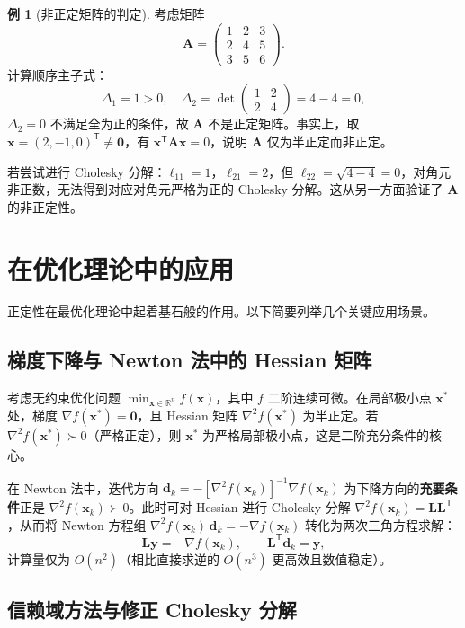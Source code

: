 \documentclass[12pt,a4paper]{article}
\theoremstyle{mystyle}
\theoremstyle{proofstyle}
\theoremstyle{definition}
\newtheorem{example}[theorem]{例}
\theoremstyle{remark}
\newcommand{\R}{\mathbb{R}}
\newcommand{\T}{^{\mathsf{T}}}
\newcommand{\x}{\mathbf{x}}
\newcommand{\y}{\mathbf{y}}
\newcommand{\A}{\mathbf{A}}
\newcommand{\Lmat}{\mathbf{L}}
\newcommand{\zero}{\mathbf{0}}
\begin{document}
\begin{example}[非正定矩阵的判定]
考虑矩阵
\[
    \A = \begin{pmatrix}
        1 & 2 & 3 \\
        2 & 4 & 5 \\
        3 & 5 & 6
    \end{pmatrix}.
\]
计算顺序主子式：
\[
    \Delta_1 = 1 > 0,\quad
    \Delta_2 = \det\begin{pmatrix} 1 & 2 \\ 2 & 4 \end{pmatrix} = 4 - 4 = 0,
\]
$\Delta_2 = 0$ 不满足全为正的条件，故 $\A$ 不是正定矩阵。事实上，取 $\x = (2,-1,0)\T \neq \zero$，有 $\x\T\A\x = 0$，说明 $\A$ 仅为半正定而非正定。

若尝试进行 Cholesky 分解：$\ell_{11}=1$，$\ell_{21}=2$，但 $\ell_{22} = \sqrt{4-4}=0$，对角元非正数，无法得到对应对角元严格为正的 Cholesky 分解。这从另一方面验证了 $\A$ 的非正定性。
\end{example}

\section{在优化理论中的应用}

正定性在最优化理论中起着基石般的作用。以下简要列举几个关键应用场景。

\subsection{梯度下降与 Newton 法中的 Hessian 矩阵}

考虑无约束优化问题 $\min_{\x \in \R^n} f(\x)$，其中 $f$ 二阶连续可微。在局部极小点 $\x^*$ 处，梯度 $\nabla f(\x^*) = \zero$，且 Hessian 矩阵 $\nabla^2 f(\x^*)$ 为半正定。若 $\nabla^2 f(\x^*) \succ 0$（严格正定），则 $\x^*$ 为严格局部极小点，这是二阶充分条件的核心。

在 Newton 法中，迭代方向 $\mathbf{d}_k = -[\nabla^2 f(\x_k)]^{-1}\nabla f(\x_k)$ 为下降方向的\textbf{充要条件}正是 $\nabla^2 f(\x_k) \succ 0$。此时可对 Hessian 进行 Cholesky 分解 $\nabla^2 f(\x_k) = \Lmat\Lmat\T$，从而将 Newton 方程组 $\nabla^2 f(\x_k)\,\mathbf{d}_k = -\nabla f(\x_k)$ 转化为两次三角方程求解：
\[
    \Lmat\y = -\nabla f(\x_k), \qquad \Lmat\T\mathbf{d}_k = \y,
\]
计算量仅为 $O(n^2)$（相比直接求逆的 $O(n^3)$ 更高效且数值稳定）。

\subsection{信赖域方法与修正 Cholesky 分解}
\end{document}
